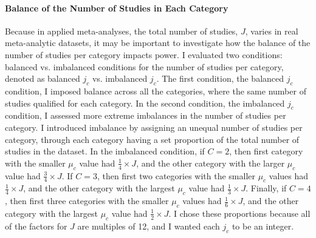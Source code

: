 \paragraph{Balance of the Number of Studies in Each Category} \label{sec: detailsbal}

Because in applied meta-analyses, the total number of studies, $J$, varies in real meta-analytic datasets, it may be important to investigate how the balance of the number of studies per category impacts power. I evaluated two conditions: balanced vs. imbalanced conditions for the number of studies per category, denoted as balanced $j_c$ vs. imbalanced $j_c$. The first condition, the balanced $j_c$ condition, I imposed balance across all the categories, where the same number of studies qualified for each category. In the second condition, the imbalanced $j_c$ condition, I assessed more extreme imbalances in the number of studies per category. I introduced imbalance by assigning an unequal number of studies per category, through each category having a set proportion of the total number of studies in the dataset. In the imbalanced condition, if $C = 2$, then first category with the smaller $\mu_c$ value had $\frac{1}{4} \times J$, and the other category  with the larger $\mu_c$ value had $\frac{3}{4} \times J$. If $C = 3$, then first two categories with the smaller $\mu_c$ values had $\frac{1}{4} \times J$, and the other category with the largest $\mu_c$ value had $\frac{1}{3} \times J$. Finally, if $C = 4$, then first three categories with the smaller $\mu_c$ values had $\frac{1}{6} \times J$, and the other category with the largest $\mu_c$ value had $\frac{1}{2} \times J$. I chose these proportions because all of the factors for $J$ are multiples of 12, and I wanted each $j_c$ to be an integer. 









